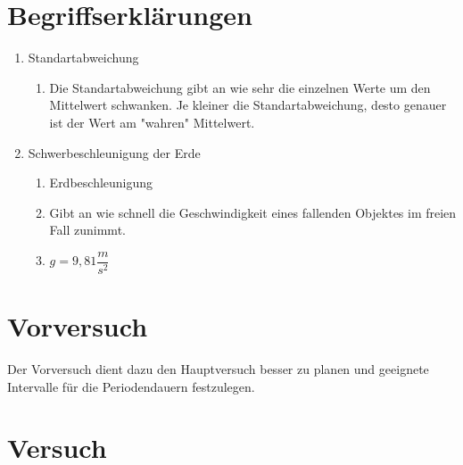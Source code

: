 \documentclass[fleqn,10pt]{olplainarticle}
\begin{document}
\section{Begriffserklärungen}
\begin{enumerate}
    \item Standartabweichung
    \begin{enumerate}
        \item Die Standartabweichung gibt an wie sehr die einzelnen Werte um den Mittelwert schwanken. Je kleiner die Standartabweichung, desto genauer ist der Wert am "wahren" Mittelwert.
    \end{enumerate}

    \item Schwerbeschleunigung der Erde
    \begin{enumerate}
        \item Erdbeschleunigung
        \item Gibt an wie schnell die Geschwindigkeit eines fallenden Objektes im freien Fall zunimmt. 
        \item $g = 9,81\dfrac{m}{s^2}$
    \end{enumerate}
\end{enumerate}


\section{Vorversuch}
Der Vorversuch dient dazu den Hauptversuch besser zu planen und geeignete Intervalle für die Periodendauern festzulegen. 

\section{Versuch}
\end{document}
